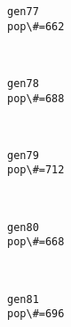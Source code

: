 \documentclass[11pt]{article}
\begin{document}
    \begin{Verbatim}[commandchars=\\\{\}]
gen77
pop\#=662

    \end{Verbatim}

    \begin{center}
    \end{center}
    { \hspace*{\fill} \\}
    
    \begin{Verbatim}[commandchars=\\\{\}]
gen78
pop\#=688

    \end{Verbatim}

    \begin{center}
    \end{center}
    { \hspace*{\fill} \\}
    
    \begin{Verbatim}[commandchars=\\\{\}]
gen79
pop\#=712

    \end{Verbatim}

    \begin{center}
    \end{center}
    { \hspace*{\fill} \\}
    
    \begin{Verbatim}[commandchars=\\\{\}]
gen80
pop\#=668

    \end{Verbatim}

    \begin{center}
    \end{center}
    { \hspace*{\fill} \\}
    
    \begin{Verbatim}[commandchars=\\\{\}]
gen81
pop\#=696

    \end{Verbatim}
\end{document}

